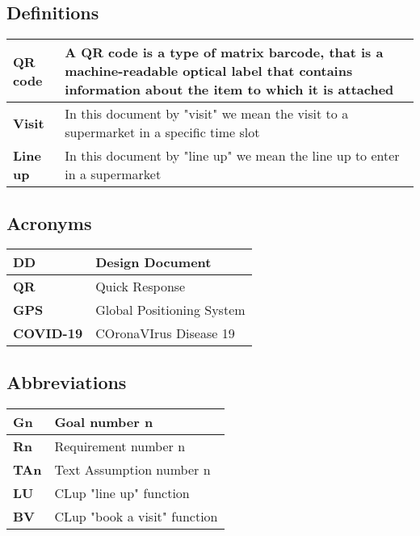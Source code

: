 \subsection{Definitions}

    \begin{center}
        {\renewcommand{\arraystretch}{2}%
        \begin{tabular}{L{2cm}L{12cm}}
            \hline
            \textbf{QR code} & A QR code is a type of matrix barcode, that is a machine-readable optical label that 
            contains information about the item to which it is attached \\
            \hline
            \textbf{Visit} & In this document by "visit" we mean the visit to a supermarket in a specific time slot \\
            \hline
            \textbf{Line up} & In this document by "line up" we mean the line up to enter in a supermarket \\
            \hline
        \end{tabular}}
    \end{center}
    

\subsection{Acronyms}

    \begin{center}
        {\renewcommand{\arraystretch}{2}%
        \begin{tabular}{L{2cm}L{12cm}}
            \hline
            \textbf{DD} & Design Document \\
            \hline
            \textbf{QR} & Quick Response \\
            \hline
            \textbf{GPS} & Global Positioning System \\
            \hline
            \textbf{COVID-19} & COronaVIrus Disease 19 \\
            \hline
        \end{tabular}}
    \end{center}

\subsection{Abbreviations}

    \begin{center}
        {\renewcommand{\arraystretch}{2}%
        \begin{tabular}{L{2cm}L{12cm}}
            \hline
            \textbf{Gn} & Goal number n \\
            \hline
            \textbf{Rn} & Requirement number n \\
            \hline
            \textbf{TAn} & Text Assumption number n \\
            \hline
            \textbf{LU} & CLup "line up" function \\
            \hline
            \textbf{BV} & CLup "book a visit" function \\
            \hline
        \end{tabular}}
    \end{center}